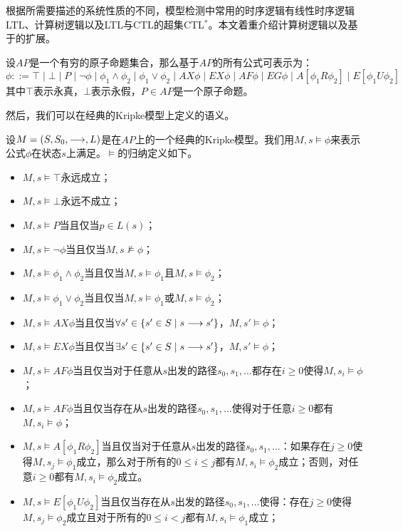 根据所需要描述的系统性质的不同，模型检测中常用的时序逻辑有线性时序逻辑\textsf{LTL}\cite{Pnueli77}、计算树逻辑\CTL{}\cite{ClarkeE08}以及\textsf{LTL}与\textsf{CTL}的超集\textsf{CTL$^*$}\cite{EmersonH86}。本文着重介绍计算树逻辑\CTL{}以及基于\CTL{}的扩展。
\begin{definition}
	设$AP$是一个有穷的原子命题集合，那么基于$AP$的所有\CTL{}公式可表示为：
	$$\phi ::= \top\mid\bot\mid P\mid \neg\phi\mid \phi_1\wedge\phi_2\mid\phi_1\vee\phi_2\mid AX\phi\mid EX\phi\mid AF\phi\mid EG\phi\mid A[\phi_1 R \phi_2]\mid E[\phi_1 U \phi_2]$$
	其中$\top$表示永真，$\bot$表示永假，$P\in AP$是一个原子命题。
\end{definition}
然后，我们可以在经典的Kripke模型上定义\CTL{}的语义。
\begin{definition}
	设$M=(S,S_0,\longrightarrow,L)$是在$AP$上的一个经典的Kripke模型。我们用$M,s\models \phi$来表示\CTL{}公式$\phi$在状态$s$上满足。$\models$的归纳定义如下。
	\begin{itemize}
		\item $M,s\models \top$永远成立；
		\item $M,s\models \bot$永远不成立；
		\item $M,s\models P$当且仅当$p\in L(s)$；
		\item $M,s\models \neg\phi$当且仅当$M,s\not\models\phi$；
		\item $M,s\models \phi_1\wedge\phi_2$当且仅当$M,s\models\phi_1$且$M,s\models\phi_2$；
		\item $M,s\models \phi_1\vee\phi_2$当且仅当$M,s\models\phi_1$或$M,s\models\phi_2$；
		\item $M,s\models AX\phi$当且仅当$\forall s'\in \{s'\in S\mid s\longrightarrow s'\}$，$M,s'\models \phi$；
		\item $M,s\models EX\phi$当且仅当$\exists s'\in \{s'\in S\mid s\longrightarrow s'\}$，$M,s'\models \phi$；
		\item $M,s\models AF\phi$当且仅当对于任意从$s$出发的路径$s_0,s_1,...$都存在$i\ge 0$使得$M,s_i\models \phi$；
		\item $M,s\models AF\phi$当且仅当存在从$s$出发的路径$s_0,s_1,...$使得对于任意$i\ge 0$都有$M,s_i\models \phi$；
		\item $M,s\models A[\phi_1 R\phi_2]$当且仅当对于任意从$s$出发的路径$s_0,s_1,...$：如果存在$j\ge 0$使得$M,s_j\models\phi_1$成立，那么对于所有的$0\le i\le j$都有$M,s_i\models\phi_2$成立；否则，对任意$i\ge 0$都有$M,s_i\models\phi_2$成立。
		\item $M,s\models E[\phi_1 U\phi_2]$当且仅当存在从$s$出发的路径$s_0,s_1,...$使得：存在$j\ge 0$使得$M,s_j\models\phi_2$成立且对于所有的$0\le i< j$都有$M,s_i\models\phi_1$成立；
	\end{itemize}
\end{definition}

